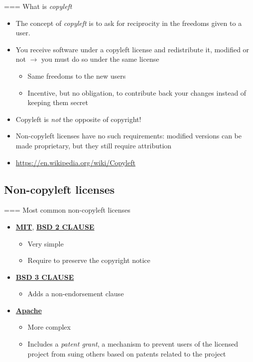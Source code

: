 === {What is {\em copyleft}}
  \begin{itemize}
  \item The concept of {\em copyleft} is to ask for reciprocity in the
    freedoms given to a user.
  \item You receive software under a copyleft license and
    redistribute it, modified or not $\rightarrow$ you must do so
    under the same license
    \begin{itemize}
    \item Same freedoms to the new users
    \item Incentive, but no obligation, to contribute back your
      changes instead of keeping them secret
    \end{itemize}
  \item Copyleft is {\em not} the opposite of copyright!
  \item Non-copyleft licenses have no such requirements: modified
    versions can be made proprietary, but they still require
    attribution
  \item \url{https://en.wikipedia.org/wiki/Copyleft}
  \end{itemize}


\subsection{Non-copyleft licenses}

=== {Most common non-copyleft licenses}
  \begin{itemize}
    \item {\bf \href{https://en.wikipedia.org/wiki/MIT_License}{MIT}}, {\bf
      \href{https://opensource.org/licenses/BSD-2-Clause}{BSD 2 CLAUSE}}
      \begin{itemize}
        \item Very simple
        \item Require to preserve the copyright notice
      \end{itemize}
    \item {\bf \href{https://opensource.org/licenses/BSD-3-Clause}{BSD 3
        CLAUSE}}
      \begin{itemize}
        \item Adds a non-endorsement clause
      \end{itemize}
    \item {\bf \href{https://www.apache.org/licenses/LICENSE-2.0}{Apache}}
      \begin{itemize}
        \item More complex
        \item Includes a {\em patent grant}, a mechanism to prevent users
          of the licensed project from suing others based on patents
          related to the project
      \end{itemize}
  \end{itemize}


